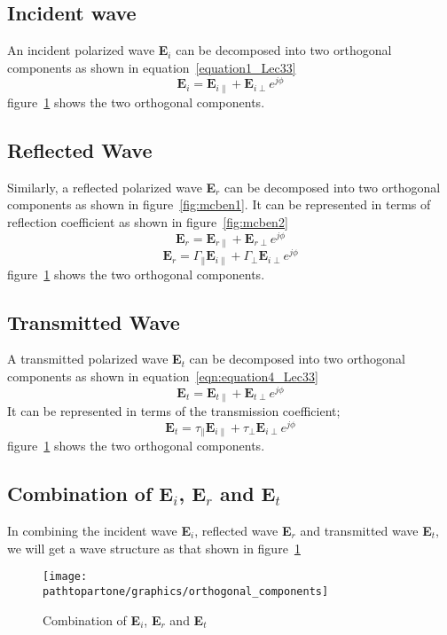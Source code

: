 \subsection{Incident wave}	
An incident polarized wave \textbf{E$_i$} can be decomposed into two orthogonal components as shown in equation~\ref{equation1_Lec33}	
\begin{equation}
\textbf{E}_i = \textbf{E}_{i\parallel} + \textbf{E}_{i\perp} e^{j\phi}
\label{equation1_Lec33}
\end{equation}
figure~\ref{fig:mcben} shows the two orthogonal components.	
\subsection{Reflected Wave}
Similarly, a reflected polarized wave \textbf{E$_r$} can be decomposed into two orthogonal components as shown in figure~\ref{fig:mcben1}. It can be represented in terms of reflection coefficient as shown in figure~\ref{fig:mcben2}
\begin{equation}
\textbf{E}_r = \textbf{E}_{r\parallel} + \textbf{E}_{r\perp} e^{j\phi}
\end{equation}	
\begin{equation}
\textbf{E}_r = \Gamma_\parallel \textbf{E}_{i\parallel} + \Gamma_\perp \textbf{E}_{i\perp} e^{j\phi}
\end{equation}	
figure~\ref{fig:mcben} shows the two orthogonal components.

\subsection{Transmitted Wave}
A transmitted polarized wave \textbf{E$_t$} can be decomposed into two orthogonal components as shown in equation~\ref{eqn:equation4_Lec33}
\begin{equation}
\textbf{E}_t = \textbf{E}_{t\parallel} + \textbf{E}_{t\perp} e^{j\phi}
\label{eqn:equation4_Lec33}
\end{equation}
It can be represented in terms of the transmission coefficient;	
\begin{equation}
\textbf{E}_t = \tau_\parallel \textbf{E}_{i\parallel} + \tau_\perp\textbf{E}_{i\perp} e^{j\phi}
\end{equation}	
figure~\ref{fig:mcben} shows the two orthogonal components.	

\subsection{Combination of \textbf{E$_i$}, \textbf{E$_r$} and \textbf{E$_t$}}
In combining the incident wave \textbf{E$_i$}, reflected wave \textbf{E$_r$} and transmitted wave \textbf{E$_t$}, we will get a wave structure as that shown in figure~\ref{fig:mcben}	
\begin{figure}[h]
\centering
\texttt{[image: \\pathtopartone/graphics/orthogonal\_components]}
\caption{Combination of \textbf{E$_i$}, \textbf{E$_r$} and \textbf{E$_t$}}
\label{fig:mcben}
\end{figure}

